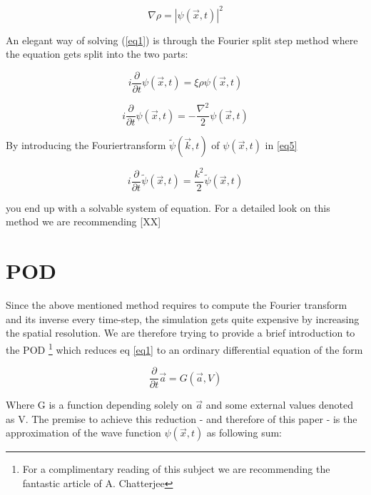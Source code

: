 \documentclass[usenatbib]{mn2e}
\begin{document}
\begin{equation} \label{eq2}
\nabla \rho =\left| \psi\left( \overrightarrow {x},t\right) \right| ^{2}
\end{equation}

An elegant way of solving (\ref{eq1}) is through the Fourier split step method where the equation gets split into the two parts:

\begin{equation} \label{eq3}
i\dfrac {\partial } {\partial t}\psi( \overrightarrow{x},t) = \xi  \rho  \psi( \overrightarrow {x},t)
\end{equation}

\begin{equation} \label{eq4}
i\dfrac {\partial } {\partial t}\psi( \overrightarrow{x},t) = -\dfrac {\nabla ^{2}} {2} \psi( \overrightarrow {x},t)
\end{equation}

By introducing the Fouriertransform \(\widetilde{\psi} (\overrightarrow {k},t)\) of \(\psi (\overrightarrow {x},t)\) in \ref{eq5} 

\begin{equation} \label{eq5}
i\dfrac {\partial } {\partial t}\widetilde{\psi}( \overrightarrow{x},t) = \dfrac {k ^{2}} {2} \widetilde{\psi}( \overrightarrow {x},t)
\end{equation}

you end up with a solvable system of equation. For a detailed look on this method we are recommending [XX]

\section{POD}
Since the above mentioned method requires to compute the Fourier transform and its inverse every time-step, the simulation gets quite expensive by increasing the spatial resolution. We are therefore trying to provide a brief introduction to the POD
\footnote{For a complimentary reading of this subject we are recommending the fantastic article of A. Chatterjee} which reduces eq \ref{eq1} to an ordinary differential equation of the form 

\begin{equation}\label{eq6}
\dfrac {\partial } {\partial t} \overrightarrow{a} = G( \overrightarrow{a},V)
\end{equation} 

Where G is a function depending solely on \(\overrightarrow{a}\) and some external values denoted as V. The premise to achieve this reduction - and therefore of this paper - is the approximation of the wave function \(\psi( \overrightarrow {x},t)\) as following sum:
\end{document}
